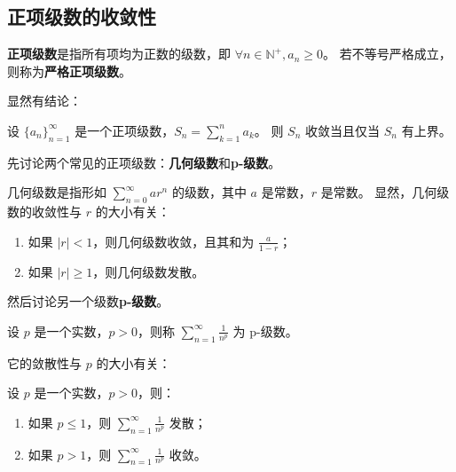 \subsection{正项级数的收敛性}\label{subsec:positive-series-convergence}

\textbf{正项级数}是指所有项均为正数的级数，即 $\forall n \in \mathbb{N}^+, a_n \geq 0$。
若不等号严格成立，则称为\textbf{严格正项级数}。

显然有结论：

\begin{lemma}\label{lem:positive-series-convergence}
  设 $\{a_n\}_{n=1}^{\infty}$ 是一个正项级数，$S_n = \sum_{k=1}^{n} a_k$。
  则 $S_n$ 收敛当且仅当 $S_n$ 有上界。
\end{lemma}

先讨论两个常见的正项级数：\textbf{几何级数}和\textbf{p-级数}。

几何级数是指形如 $\sum_{n=0}^{\infty} ar^n$ 的级数，其中 $a$ 是常数，$r$ 是常数。
显然，几何级数的收敛性与 $r$ 的大小有关：

\begin{enumerate}
  \item 如果 $|r| < 1$，则几何级数收敛，且其和为 $\frac{a}{1 - r}$；
  \item 如果 $|r| \geq 1$，则几何级数发散。
\end{enumerate}

然后讨论另一个级数\textbf{p-级数}。

\begin{definition}[p-级数]\label{def:p-series}
  设 $p$ 是一个实数，$p > 0$，则称 $\sum_{n=1}^{\infty} \frac{1}{n^p}$ 为 p-级数。
\end{definition}

它的敛散性与 $p$ 的大小有关：

\begin{theorem}[p-级数的敛散性]\label{thm:p-series-convergence}
  设 $p$ 是一个实数，$p > 0$，则：
  \begin{enumerate}
    \item 如果 $p \leq 1$，则 $\sum_{n=1}^{\infty} \frac{1}{n^p}$ 发散；
    \item 如果 $p > 1$，则 $\sum_{n=1}^{\infty} \frac{1}{n^p}$ 收敛。
  \end{enumerate}

\end{theorem}

